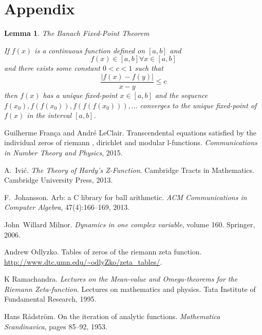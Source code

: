 \documentclass{article}
\newcommand{\tmtextit}[1]{{\itshape{#1}}}
\newtheorem{lemma}{Lemma}
{\theorembodyfont{\rmfamily}\newtheorem{note}{Note}}
\begin{document}
\section{Appendix}

\begin{lemma}
  The Banach Fixed-Point Theorem
  
  If $f (x)$ is a continuous function defined on $[a, b]$ and
  \begin{equation}
    f (x) \in [a, b] \forall x \in [a, b]
  \end{equation}
  and there exists some constant $0 < c < 1$ such that
  \begin{equation}
    \text{$\frac{| f (x) - f (y) |}{x - y} \leqslant c$} \label{lc}
  \end{equation}
  then $f (x)$ has a unique fixed-point $x \in [a, b]$ and the sequence $f
  (x_0), f (f (x_0)), f (f (f (x_0))), \ldots$ converges to the unique
  fixed-point of $f (x)$ in the interval $[a, b]$.
\end{lemma}

\begin{thebibliography}{1}
  Guilherme Fran{\c c}a  and  Andr{\'e} LeClair.{\newblock}
  Transcendental equations satisfied by the individual zeros of riemann
  {\zeta}, dirichlet and modular l-functions.{\newblock}
  \tmtextit{Communications in Number Theory and Physics}, 2015.{\newblock}
  
  A.~Ivi{\'c}.{\newblock} \tmtextit{The Theory of Hardy's
  Z-Function}.{\newblock} Cambridge Tracts in Mathematics. Cambridge
  University Press, 2013.{\newblock}
  
  F.~Johansson.{\newblock} Arb: a C library for
  ball arithmetic.{\newblock} \tmtextit{ACM Communications in Computer
  Algebra}, 47(4):166--169, 2013.{\newblock}
  
  John~Willard Milnor.{\newblock}
  \tmtextit{Dynamics in one complex variable},  volume  160.{\newblock}
  Springer, 2006.{\newblock}
  
  Andrew Odlyzko.{\newblock} Tables of zeros of the riemann
  zeta function.{\newblock}
  \url{http://www.dtc.umn.edu/~odlyZko/zeta_tables/}.{\newblock}
  
  K Ramachandra.{\newblock}
  \tmtextit{Lectures on the Mean-value and Omega-theorems for the Riemann
  Zeta-function}.{\newblock} Lectures on mathematics and physics. Tata
  Institute of Fundamental Research, 1995.{\newblock}
  
  Hans R{\r a}dstr{\"o}m.{\newblock} On the
  iteration of analytic functions.{\newblock} \tmtextit{Mathematica
  Scandinavica},  pages  85--92, 1953.{\newblock}
\end{thebibliography}
\end{document}

